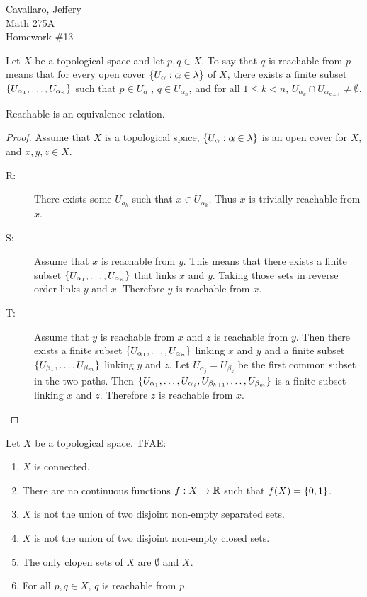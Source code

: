 \documentclass[letterpaper,12pt,fleqn]{article}
\renewcommand{\a}{\alpha}
\renewcommand{\b}{\beta}
\renewcommand{\l}{\lambda}
\begin{document}
Cavallaro, Jeffery \\
Math 275A \\
Homework \#13

\bigskip

\begin{definition}[Reachable]
  Let \(X\) be a topological space and let \(p,q\in X\).  To say that \(q\) is reachable from \(p\) means that
  for every open cover \(\set{U_{\a}:\a\in\l}\) of \(X\), there exists a finite subset
  \(\set{U_{\a_1},\ldots,U_{\a_n}}\) such that \(p\in U_{\a_1}\), \(q\in U_{\a_n}\), and for all \(1\le k<n\),
  \(U_{\a_k}\cap U_{\a_{k+1}}\ne\emptyset\).
\end{definition}

\begin{lemma}
  Reachable is an equivalence relation.
\end{lemma}

\begin{proof}
  Assume that \(X\) is a topological space, \(\set{U_{\a}:\a\in\l}\) is an open cover for \(X\), and
  \(x,y,z\in X\).
  \begin{description}
  \item[R:] There exists some \(U_{a_k}\) such that \(x\in U_{\a_k}\).  Thus \(x\) is trivially reachable from
    \(x\).

  \item[S:] Assume that \(x\) is reachable from \(y\).  This means that there exists a finite subset
    \(\set{U_{\a_1},\ldots,U_{\a_n}}\) that links \(x\) and \(y\).  Taking those sets in reverse order links
    \(y\) and \(x\).  Therefore \(y\) is reachable from \(x\).

  \item[T:] Assume that \(y\) is reachable from \(x\) and \(z\) is reachable from \(y\).  Then there exists
    a finite subset \(\set{U_{\a_1},\ldots,U_{\a_n}}\) linking \(x\) and \(y\) and a finite subset
    \(\set{U_{\b_1},\ldots,U_{\b_m}}\) linking \(y\) and \(z\).  Let \(U_{\a_j}=U_{\b_k}\) be the first common
    subset in the two paths.  Then \(\set{U_{\a_1},\ldots,U_{\a_j},U_{\b_{k+1}},\ldots,U_{\b_m}}\) is a finite
    subset linking \(x\) and \(z\).  Therefore \(z\) is reachable from \(x\).
  \end{description}
\end{proof}

\begin{theorem}[8.1]
  Let \(X\) be a topological space.  TFAE:
  \begin{enumerate}
  \item \(X\) is connected.
  \item There are no continuous functions \(f:X\to\mathbb{R}\) such that \(f(X)=\{0,1\}\).
  \item \(X\) is not the union of two disjoint non-empty separated sets.
  \item \(X\) is not the union of two disjoint non-empty closed sets.
  \item The only clopen sets of \(X\) are \(\emptyset\) and \(X\).
  \item For all \(p,q\in X\), \(q\) is reachable from \(p\).
  \end{enumerate}
\end{theorem}
\end{document}
